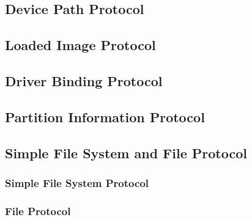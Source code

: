 \subsection{Device Path Protocol}

\clearpage

\subsection{Loaded Image Protocol}

\clearpage

\subsection{Driver Binding Protocol}

\clearpage

\subsection{Partition Information Protocol}

\clearpage

\subsection{Simple File System and File Protocol}

\subsubsection{Simple File System Protocol}


\subsubsection{File Protocol}

\clearpage

